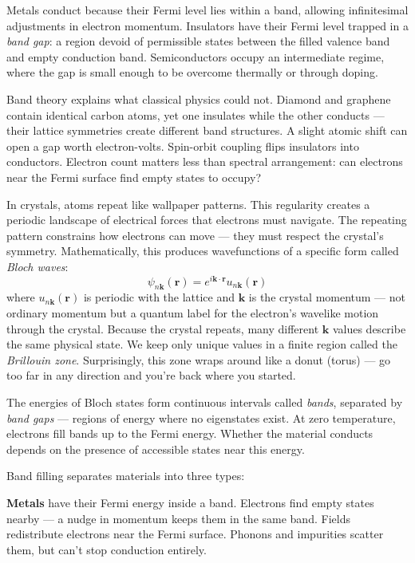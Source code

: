 Metals conduct because their Fermi level lies within a band, allowing infinitesimal adjustments in electron momentum. Insulators have their Fermi level trapped in a \emph{band gap}: a region devoid of permissible states between the filled valence band and empty conduction band. Semiconductors occupy an intermediate regime, where the gap is small enough to be overcome thermally or through doping. 

Band theory explains what classical physics could not. Diamond and graphene contain identical carbon atoms, yet one insulates while the other conducts — their lattice symmetries create different band structures. A slight atomic shift can open a gap worth electron-volts. Spin-orbit coupling flips insulators into conductors. Electron count matters less than spectral arrangement: can electrons near the Fermi surface find empty states to occupy?

In crystals, atoms repeat like wallpaper patterns. This regularity creates a periodic landscape of electrical forces that electrons must navigate. The repeating pattern constrains how electrons can move — they must respect the crystal's symmetry. Mathematically, this produces wavefunctions of a specific form called \emph{Bloch waves}:
\[
\psi_{n\mathbf{k}}(\mathbf{r}) = e^{i\mathbf{k} \cdot \mathbf{r}} u_{n\mathbf{k}}(\mathbf{r})
\]
where \( u_{n\mathbf{k}}(\mathbf{r}) \) is periodic with the lattice and \( \mathbf{k} \) is the crystal momentum — not ordinary momentum but a quantum label for the electron's wavelike motion through the crystal. Because the crystal repeats, many different \( \mathbf{k} \) values describe the same physical state. We keep only unique values in a finite region called the \emph{Brillouin zone}. Surprisingly, this zone wraps around like a donut (torus) — go too far in any direction and you're back where you started.

The energies of Bloch states form continuous intervals called \emph{bands}, separated by \emph{band gaps} — regions of energy where no eigenstates exist. At zero temperature, electrons fill bands up to the Fermi energy. Whether the material conducts depends on the presence of accessible states near this energy.

Band filling separates materials into three types:

\textbf{Metals} have their Fermi energy inside a band. Electrons find empty states nearby — a nudge in momentum keeps them in the same band. Fields redistribute electrons near the Fermi surface. Phonons and impurities scatter them, but can't stop conduction entirely.

